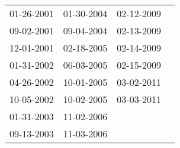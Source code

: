 \begin{supertabular}{llll}
 01-26-2001 &  01-30-2004 &  02-12-2009 \\
 09-02-2001 &  09-04-2004 &  02-13-2009 \\
 12-01-2001 &  02-18-2005 &  02-14-2009 \\
 01-31-2002 &  06-03-2005 &  02-15-2009 \\
 04-26-2002 &  10-01-2005 &  03-02-2011 \\
 10-05-2002 &  10-02-2005 &  03-03-2011 \\
 01-31-2003 &  11-02-2006 &             \\
 09-13-2003 &  11-03-2006 &             \\
\end{supertabular}

